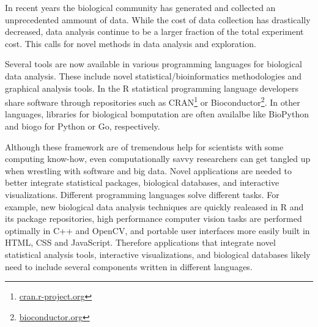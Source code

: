 
In recent years the biological community has generated and collected an
unprecedented ammount of data.
While the cost of data collection has drastically decreased, data analysis
continue to be a larger fraction of the total experiment
cost.\cite{sboner2011real}
This calls for novel methods in data analysis and
exploration. 

Several tools are now available in various programming languages for biological data
analysis. These include novel statistical/bioinformatics methodologies and
graphical analysis tools.
In the R statistical programming language developers share software through
repositories such as CRAN\footnote{\url{cran.r-project.org}} or
Bioconductor\footnote{\url{bioconductor.org}}.  In other languages, libraries
for biological bomputation are often availalbe like BioPython\cite{biopython}
and biogo\cite{biogo} for Python or Go, respectively. 

Although these framework are of tremendous help for scientists with some
computing know-how, even computationally savvy researchers 
can get tangled up when wrestling with software and big data. 
Novel applications are needed to better integrate statistical
packages, biological databases, and interactive visualizations.
Different programming languages solve different tasks. 
For example, new biological data analysis techniques are quickly realeased in R
and its package repositories, high performance computer vision tasks are
performed optimally in C++ and OpenCV, and portable user interfaces more easily
built in HTML, CSS and JavaScript. Therefore applications that integrate novel
statistical analysis tools, interactive visualizations, and biological databases
likely need to include several components written in different languages. 


